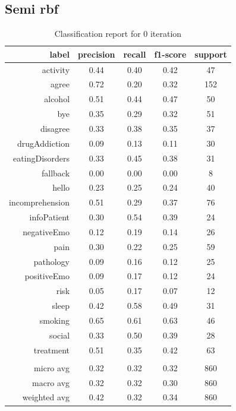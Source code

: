 \documentclass[11pt]{article}
\begin{document}
\subsection{Semi rbf}

\begin{table}[htb]
\begin{center}
\begin{tabular}{ |r|c|c|c|c| }
\hline
label 			& precision & recall & f1-score & support\\ \hline 
activity 		& 0.44 & 0.40 & 0.42 &  47\\ \hline 
agree 			& 0.72 & 0.20 & 0.32 & 152\\ \hline 
alcohol 		& 0.51 & 0.44 & 0.47 &  50\\ \hline 
bye 			& 0.35 & 0.29 & 0.32 &  51\\ \hline 
disagree 		& 0.33 & 0.38 & 0.35 &  37\\ \hline 
drugAddiction 	& 0.09 & 0.13 & 0.11 &  30\\ \hline 
eatingDisorders & 0.33 & 0.45 & 0.38 &  31\\ \hline 
fallback 		& 0.00 & 0.00 & 0.00 &   8\\ \hline 
hello 			& 0.23 & 0.25 & 0.24 &  40\\ \hline 
incomprehension & 0.51 & 0.29 & 0.37 &  76\\ \hline 
infoPatient 	& 0.30 & 0.54 & 0.39 &  24\\ \hline 
negativeEmo 	& 0.12 & 0.19 & 0.14 &  26\\ \hline 
pain 			& 0.30 & 0.22 & 0.25 &  59\\ \hline 
pathology 		& 0.09 & 0.16 & 0.12 &  25\\ \hline 
positiveEmo 	& 0.09 & 0.17 & 0.12 &  24\\ \hline 
risk 			& 0.05 & 0.17 & 0.07 &  12\\ \hline 
sleep 			& 0.42 & 0.58 & 0.49 &  31\\ \hline 
smoking 		& 0.65 & 0.61 & 0.63 &  46\\ \hline 
social 			& 0.33 & 0.50 & 0.39 &  28\\ \hline 
treatment 		& 0.51 & 0.35 & 0.42 &  63\\ \hline 
\\ \hline 
micro avg 		& 0.32 & 0.32 & 0.32 & 860\\ \hline 
macro avg 		& 0.32 & 0.32 & 0.30 & 860\\ \hline 
weighted avg 	& 0.42 & 0.32 & 0.34 & 860\\ \hline 
\end{tabular}
\caption{Classification report for 0 iteration}
\end{center}
\end{table}
\FloatBarrier
\end{document}
